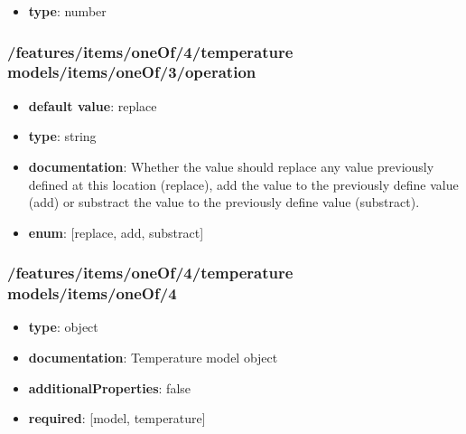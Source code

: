 \begin{itemize}\item {\bf type}: number
\end{itemize}\subsubsection{/features/items/oneOf/4/temperature models/items/oneOf/3/operation}
\begin{itemize}\item {\bf default value}: replace
\item {\bf type}: string
\item {\bf documentation}: Whether the value should replace any value previously defined at this location (replace), add the value to the previously define value (add) or substract the value to the previously define value (substract).
\item {\bf enum}: [replace, add, substract]\end{itemize}\subsubsection{/features/items/oneOf/4/temperature models/items/oneOf/4}
\begin{itemize}\item {\bf type}: object
\item {\bf documentation}: Temperature model object
\item {\bf additionalProperties}: false
\item {\bf required}: [model, temperature]\end{itemize}
